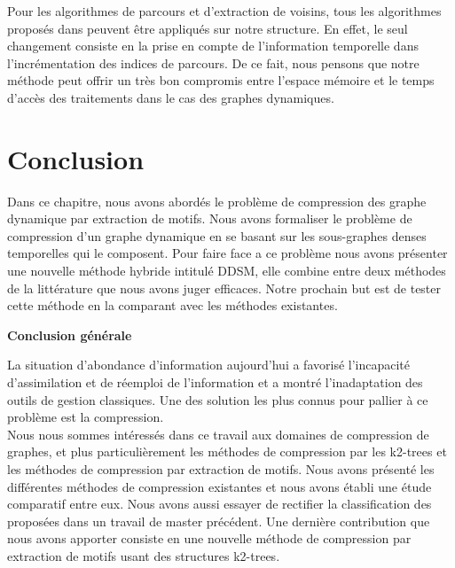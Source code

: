 \documentclass[a4paper,oneside,12pt]{report}
\theoremstyle{definition}
\newtheorem{defn}{Definition}[section]
\begin{document}
			Pour les algorithmes de parcours et d'extraction de voisins, tous les algorithmes proposés dans \citep{hernandez2014compressed} peuvent être appliqués sur notre structure. En effet, le seul changement consiste en la  prise en compte de l'information temporelle dans l'incrémentation des indices de parcours. De ce fait, nous pensons que notre méthode peut offrir un très bon compromis entre l'espace mémoire et le temps d'accès des traitements dans le cas des graphes dynamiques. 
			
		\section{Conclusion}
	Dans ce chapitre, nous avons abordés le problème de compression des graphe dynamique par extraction de motifs. Nous avons formaliser le problème de compression d'un graphe dynamique en se basant sur les sous-graphes denses temporelles qui le composent. Pour faire face a ce problème nous avons présenter une nouvelle méthode hybride intitulé DDSM, elle combine entre deux méthodes de la littérature que nous avons juger efficaces. Notre prochain but est de tester cette méthode en la comparant avec les méthodes existantes.   

	
	
	
	



\newpage

	\par
		\vskip 1in
		\Huge 
			\textbf{Conclusion générale} \\[0.5in]
		
		\normalsize
		
	La situation d'abondance d'information aujourd'hui a favorisé l'incapacité d'assimilation et de réemploi de l'information et a montré l'inadaptation des outils de gestion classiques. Une des solution les plus connus pour pallier à ce problème est la compression.\\
		
		Nous nous sommes intéressés dans ce travail aux domaines de compression de graphes, et plus particulièrement les méthodes de compression par les k2-trees et les méthodes de compression par extraction de motifs. Nous avons présenté les différentes méthodes de compression existantes et nous avons établi une étude comparatif entre eux. Nous avons aussi essayer de rectifier la classification des proposées dans un travail de master précédent. Une dernière contribution que nous avons apporter consiste en une nouvelle méthode de compression par extraction de motifs usant des structures k2-trees.\\  
	
\end{document}
